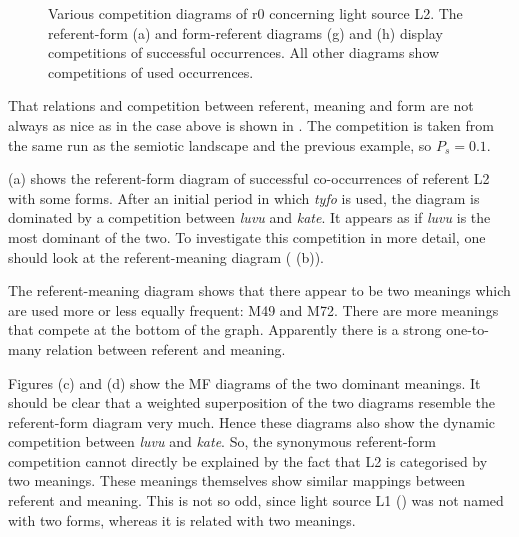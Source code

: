 \begin{figure}
\centering
{}
\caption{Various competition diagrams of r0 concerning light source L2. The referent-form (a) and form-referent diagrams (g) and (h) display competitions of successful occurrences. All other diagrams show competitions of used occurrences.}
\label{f:opt:ggcomp2}
\end{figure}

That relations and competition between referent, meaning and form are not always as nice as in the case above is shown in . The competition is taken from the same run as the semiotic landscape and the previous example, so $P_s=0.1$.

 (a) shows the referent-form diagram of successful co-occurrences of referent L2 with some forms. After an initial period in which {\it tyfo} is used, the diagram is dominated by a competition between {\it luvu} and {\it kate}. It appears as if {\it luvu} is the most dominant of the two. To investigate this competition in more detail, one should look at the referent-meaning diagram ( (b)).

The referent-meaning diagram shows that there appear to be two meanings which are used more or less equally frequent: M49 and M72. There are more meanings that compete at the bottom of the graph. Apparently there is a strong one-to-many relation between referent and meaning. 

Figures (c) and (d) show the MF diagrams of the two dominant meanings. It should be clear that a weighted superposition of the two diagrams resemble the referent-form diagram very much. Hence these diagrams also show the dynamic competition between {\it luvu} and {\it kate}. So, the synonymous referent-form competition cannot directly be explained by the fact that L2 is categorised by two meanings. These meanings themselves show similar mappings between referent and meaning. This is not so odd, since light source L1 () was not named with two forms, whereas it is related with two meanings.

